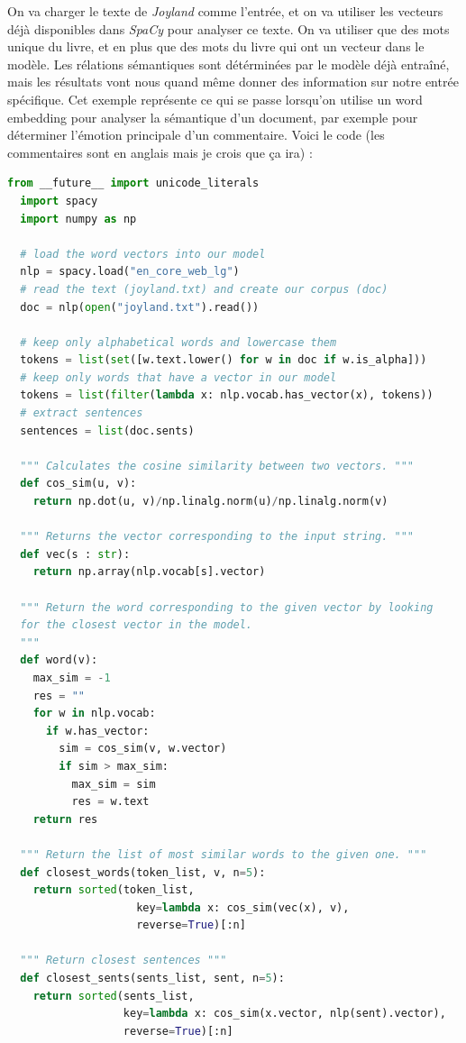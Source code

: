 \documentclass[11pt, a4paper]{report}
\begin{document}
On va charger le texte de \textit{Joyland} comme l'entrée, et on va utiliser les 
vecteurs déjà disponibles dans \textit{SpaCy} pour analyser ce texte. On va utiliser que 
des mots unique du livre, et en plus que des mots du livre qui ont un vecteur dans le 
modèle. Les rélations sémantiques sont détérminées par le modèle déjà entraîné, mais 
les résultats vont nous quand même donner des information sur notre entrée spécifique. 
Cet exemple représente ce qui se passe lorsqu'on utilise un word embedding pour analyser 
la sémantique d'un document, par exemple pour déterminer l'émotion principale d'un commentaire.
Voici le code (les commentaires sont en anglais mais je crois que ça ira) \cite{gensim-tuto}: 

\begin{lstlisting}[language=Python]
  from __future__ import unicode_literals
  import spacy 
  import numpy as np 

  # load the word vectors into our model 
  nlp = spacy.load("en_core_web_lg")
  # read the text (joyland.txt) and create our corpus (doc)
  doc = nlp(open("joyland.txt").read())

  # keep only alphabetical words and lowercase them 
  tokens = list(set([w.text.lower() for w in doc if w.is_alpha]))
  # keep only words that have a vector in our model 
  tokens = list(filter(lambda x: nlp.vocab.has_vector(x), tokens))
  # extract sentences
  sentences = list(doc.sents)

  """ Calculates the cosine similarity between two vectors. """
  def cos_sim(u, v):
    return np.dot(u, v)/np.linalg.norm(u)/np.linalg.norm(v)

  """ Returns the vector corresponding to the input string. """
  def vec(s : str):
    return np.array(nlp.vocab[s].vector)

  """ Return the word corresponding to the given vector by looking 
  for the closest vector in the model.
  """
  def word(v):
    max_sim = -1 
    res = ""
    for w in nlp.vocab:
      if w.has_vector:
        sim = cos_sim(v, w.vector)
        if sim > max_sim:
          max_sim = sim 
          res = w.text
    return res  

  """ Return the list of most similar words to the given one. """
  def closest_words(token_list, v, n=5):
    return sorted(token_list, 
                    key=lambda x: cos_sim(vec(x), v), 
                    reverse=True)[:n]

  """ Return closest sentences """
  def closest_sents(sents_list, sent, n=5):
    return sorted(sents_list, 
                  key=lambda x: cos_sim(x.vector, nlp(sent).vector), 
                  reverse=True)[:n]
\end{lstlisting}
\end{document}
